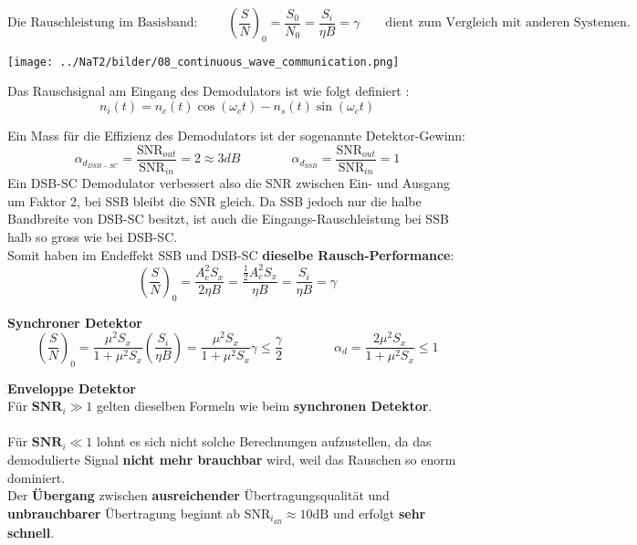 $$ \text{Die Rauschleistung im Basisband: } \qquad \boxed{\left(\dfrac{S}{N}\right)_0 =
\dfrac{S_0}{N_0} = \dfrac{S_i}{\eta B} = \gamma} \qquad \text{dient zum Vergleich mit anderen
Systemen.}$$

\begin{center}
	\texttt{[image: ../NaT2/bilder/08\_continuous\_wave\_communication.png]}
\end{center}

Das Rauschsignal am Eingang des Demodulators ist wie folgt definiert
:  
$$n_i(t) = n_c(t) \cos(\omega_c t) - n_s(t) \sin(\omega_c t) $$


Ein Mass für die Effizienz des Demodulators ist der sogenannte Detektor-Gewinn: \\
$$ \alpha_{d_{DSB-SC}} = \dfrac{\text{SNR}_{out}}{\text{SNR}_{in}} = 2 \approx 3 dB
\qquad \qquad
 \alpha_{d_{SSB}} = \dfrac{\text{SNR}_{out}}{\text{SNR}_{in}} = 1
$$
Ein DSB-SC Demodulator verbessert also die SNR zwischen Ein- und Ausgang um Faktor 2, bei SSB
bleibt die SNR gleich. Da SSB jedoch nur die halbe Bandbreite von DSB-SC besitzt, ist auch die
Eingangs-Rauschleistung bei SSB halb so gross wie bei DSB-SC. \\
Somit haben im Endeffekt SSB und DSB-SC \textbf{dieselbe Rausch-Performance}: 
	$$ \left(\dfrac{S}{N}\right)_0 =
	\dfrac{A_c^2 S_x}{2 \eta B} = \dfrac{\frac12 A_c^2 S_x}{\eta B} = \dfrac{S_i}{\eta B} = \gamma $$


\textbf{Synchroner Detektor}
$$ \left(\dfrac{S}{N}\right)_0 =
\dfrac{\mu^2 S_x}{1 + \mu^2 S_x} \left(\dfrac{S_i}{\eta B}\right) = \dfrac{\mu^2 S_x}{1 + \mu^2
S_x} \gamma \leq \dfrac{\gamma}{2} \qquad \qquad
\alpha_d = \dfrac{2 \mu^2 S_x}{1 + \mu^2 S_x} \leq 1$$


\textbf{Enveloppe Detektor} \\
Für \boldmath$ \textbf{SNR}_i \gg 1 $ gelten dieselben Formeln wie beim \textbf{synchronen
Detektor}. \\ \\ Für \boldmath$ \textbf{SNR}_i \ll 1 $ lohnt es sich nicht solche
Berechnungen aufzustellen, da das demodulierte Signal \textbf{nicht mehr brauchbar} wird, weil das Rauschen so enorm dominiert. \\
Der \textbf{Übergang} zwischen \textbf{ausreichender} Übertragungsqualität und \textbf{unbrauchbarer}  
Übertragung beginnt ab \unboldmath$ \text{SNR}_{i_{dB}} \approx 10 \text{dB} $ und erfolgt
\textbf{sehr schnell}.

